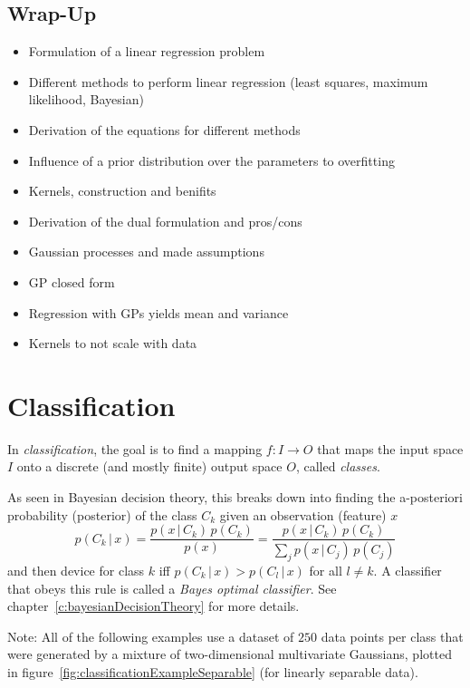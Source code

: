 \documentclass[a4paper, 11pt, accentcolor = tud3b]{tudreport}
\newcommand{\given}{\ensuremath{\,\vert\,}}
\begin{document}
		\section{Wrap-Up}
			\begin{itemize}
				\item Formulation of a linear regression problem
				\item Different methods to perform linear regression (least squares, maximum likelihood, Bayesian)
				\item Derivation of the equations for different methods
				\item Influence of a prior distribution over the parameters to overfitting
				\item Kernels, construction and benifits
				\item Derivation of the dual formulation and pros/cons
				\item Gaussian processes and made assumptions
				\item GP closed form
				\item Regression with GPs yields mean and variance
				\item Kernels to not scale with data
			\end{itemize}

	\chapter{Classification}
		In \emph{classification}, the goal is to find a mapping \( f : I \to O \) that maps the input space \(I\) onto a discrete (and mostly finite) output space \(O\), called \emph{classes}.

		As seen in Bayesian decision theory, this breaks down into finding the a-posteriori probability (posterior) of the class \(C_k\) given an observation (feature) \(x\)
		\begin{equation}
			p(C_k \given x) = \frac{p(x \given C_k) \, p(C_k)}{p(x)} = \frac{p(x \given C_k) \, p(C_k)}{\sum_j p(x \given C_j) \, p(C_j)}
		\end{equation}
		and then device for class \(k\) iff \( p(C_k \given x) > p(C_l \given x) \) for all \( l \neq k \). A classifier that obeys this rule is called a \emph{Bayes optimal classifier}. See chapter~\ref{c:bayesianDecisionTheory} for more details.

		Note: All of the following examples use a dataset of \(250\) data points per class that were generated by a mixture of two-dimensional multivariate Gaussians, plotted in figure~\ref{fig:classificationExampleSeparable} (for linearly separable data).
\end{document}
